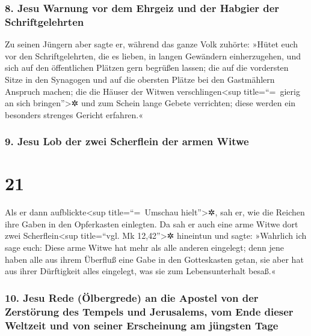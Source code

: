 \hypertarget{jesu-warnung-vor-dem-ehrgeiz-und-der-habgier-der-schriftgelehrten}{%
\subsubsection{8. Jesu Warnung vor dem Ehrgeiz und der Habgier der
Schriftgelehrten}\label{jesu-warnung-vor-dem-ehrgeiz-und-der-habgier-der-schriftgelehrten}}

 Zu seinen Jüngern aber sagte er, während das ganze Volk
zuhörte:  »Hütet euch vor den Schriftgelehrten, die es
lieben, in langen Gewändern einherzugehen, und sich auf den öffentlichen
Plätzen gern begrüßen lassen; die auf die vordersten Sitze in den
Synagogen und auf die obersten Plätze bei den Gastmählern Anspruch
machen;  die die Häuser der Witwen
verschlingen\textless sup title=``=~gierig an sich
bringen''\textgreater✲ und zum Schein lange Gebete verrichten; diese
werden ein besonders strenges Gericht erfahren.«

\hypertarget{jesu-lob-der-zwei-scherflein-der-armen-witwe}{%
\subsubsection{9. Jesu Lob der zwei Scherflein der armen
Witwe}\label{jesu-lob-der-zwei-scherflein-der-armen-witwe}}

\hypertarget{section-20}{%
\section{21}\label{section-20}}

 Als er dann aufblickte\textless sup title=``=~Umschau
hielt''\textgreater✲, sah er, wie die Reichen ihre Gaben in den
Opferkasten einlegten.  Da sah er auch eine arme Witwe
dort zwei Scherflein\textless sup title=``vgl. Mk 12,42''\textgreater✲
hineintun  und sagte: »Wahrlich ich sage euch: Diese arme
Witwe hat mehr als alle anderen eingelegt;  denn jene
haben alle aus ihrem Überfluß eine Gabe in den Gotteskasten getan, sie
aber hat aus ihrer Dürftigkeit alles eingelegt, was sie zum
Lebensunterhalt besaß.«

\hypertarget{jesu-rede-uxf6lbergrede-an-die-apostel-von-der-zerstuxf6rung-des-tempels-und-jerusalems-vom-ende-dieser-weltzeit-und-von-seiner-erscheinung-am-juxfcngsten-tage}{%
\subsubsection{10. Jesu Rede (Ölbergrede) an die Apostel von der
Zerstörung des Tempels und Jerusalems, vom Ende dieser Weltzeit und von
seiner Erscheinung am jüngsten
Tage}\label{jesu-rede-uxf6lbergrede-an-die-apostel-von-der-zerstuxf6rung-des-tempels-und-jerusalems-vom-ende-dieser-weltzeit-und-von-seiner-erscheinung-am-juxfcngsten-tage}}

